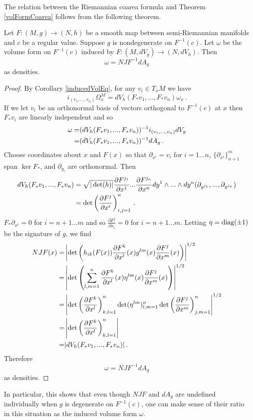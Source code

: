The relation between the Riemannian coarea formula and Theorem \ref{volFormCoarea} follows from the following theorem.
\begin{theorem}
Let $F:(M,g)\rightarrow (N,h)$  be a smooth map between semi-Riemannian manifolds and $c$ be a regular value.  Suppose $g$ is nondegenerate on $F^{-1}(c)$.  Let $\omega$ be the volume form on $F^{-1}(c)$ induced by $F:(M,dV_g)\rightarrow (N,dV_h)$.  Then
\begin{equation}
\omega=NJF^{-1}dA_g
\end{equation}
as densities.
\end{theorem}
\begin{proof}
By Corollary \ref{inducedVolEq}, for any  $v_i\in T_xM$ we have
\begin{equation}
i_{(v_1,...,v_n)}\Omega^M_x=dV_h(F_*v_1,...,F_*v_n)\omega_x\,.
\end{equation}
If we let $v_i$ be an orthonormal basis of vectors orthogonal to $F^{-1}(c)$ at $x$ then $F_*v_i$ are linearly independent and so
\begin{align}
\omega=&(dV_h(F_*v_1,...,F_*v_n))^{-1}i_{(v_1,...,v_n)}dV_g\\
=&(dV_h(F_*v_1,...,F_*v_n))^{-1}dA_g\,.\notag
\end{align}
Choose coordinates about $x$ and $F(x)$ so that $\partial_{x^i}=v_i$ for $i=1...n$, $\{\partial_{x^i}\}_{n+1}^m$ span $\ker F_*$, and $\partial_{y_i}$ are orthonormal.  Then 
\begin{align}
dV_h(F_*v_1,...,F_*v_n)&=\sqrt{|\det(h)|}\frac{\partial F^{j_1}}{\partial x^1}...\frac{\partial F^{j_n}}{\partial x^n}dy^1\wedge...\wedge dy^n(\partial_{y^{j_1}},...,\partial_{y^{j_n}})\\
&=\det\left(\frac{\partial F^{j}}{\partial x^i}\right)_{i,j=1}^n\,.\notag
\end{align}
$F_*\partial_{x^i}=0$ for $i=n+1...m$ and so $\frac{\partial F^j}{\partial x_i}=0$ for $i=n+1...m$.  Letting $\eta=\mathrm{diag}(\pm 1)$ be the signature of $g$, we find
\begin{align}
NJF(x)=&\left|\det\left(h_{ik}(F(x))\frac{\partial F^k}{\partial x^l}(x)g^{lm}(x)\frac{\partial F^j}{\partial x^m}(x)\right)\right|^{1/2}\\
=&\left|\det\left(\sum_{l,m=1}^n\frac{\partial F^k}{\partial x^l}(x)\eta^{lm}(x)\frac{\partial F^j}{\partial x^m}(x)\right)\right|^{1/2}\notag\\
=&\left|\det\left(\frac{\partial F^k}{\partial x^l}\right)_{k,l=1}^n\det(\eta^{lm})_{l,m=1}^n\det\left(\frac{\partial F^j}{\partial x^m}\right)_{j,m=1}^n\right|^{1/2}\notag\\
=&\left|\det\left(\frac{\partial F^k}{\partial x^l}\right)_{k,l=1}^n\right|\notag\\
=&|dV_h(F_*v_1,...,F_*v_n)|\,.\notag
\end{align}
Therefore 
\begin{equation}
\omega=NJF^{-1}dA_g
\end{equation}
as densities.
\end{proof}
In particular, this shows that even though $NJF$ and $dA_g$ are undefined individually when $g$ is degenerate on $F^{-1}(c)$, one can make sense of their ratio in this situation as the induced volume form $\omega$.


